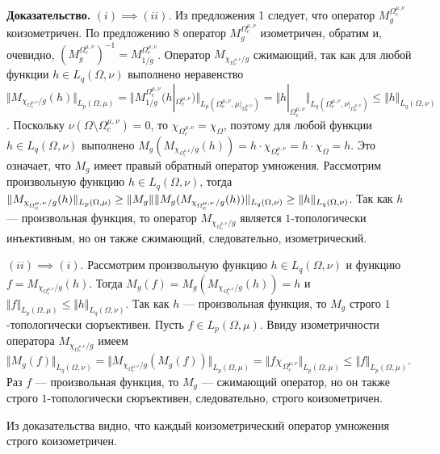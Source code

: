 \documentclass[11pt,twoside]{article}
\begin{document}
\textbf{Доказательство.} $(i)$$\implies$$ (ii)$. Из предложения 1 следует, что
оператор $M_g^{\Omega_c^{\mu,\nu}}$ коизометричен. По предложению 8
оператор $M_g^{\Omega_c^{\mu,\nu}}$ изометричен, обратим и, очевидно,
${(M_g^{\Omega_c^{\mu,\nu}})}^{-1}=M_{1/g}^{\Omega_c^{\mu,\nu}}$.
Оператор $M_{\chi_{\Omega_c^{\mu,\nu}}/g}$ сжимающий, так как для любой
функции $h\in L_q(\Omega,\nu)$ выполнено неравенство $\Vert
M_{\chi_{\Omega_c^{\mu,\nu}}/g}(h)\Vert_{L_p(\Omega,\mu)}= \Vert
M_{1/g}^{\Omega_c^{\mu,\nu}}(h|_{\Omega_c^{\mu,\nu}})
\Vert_{L_p(\Omega_c^{\mu,\nu},\mu|_{\Omega_c^{\mu,\nu}})} =\Vert
h|_{\Omega_c^{\mu,\nu}}
\Vert_{L_q(\Omega_c^{\mu,\nu},\nu|_{\Omega_c^{\mu,\nu}})} \leq\Vert h
\Vert_{L_q(\Omega,\nu)}$. Поскольку
$\nu(\Omega\setminus\Omega_c^{\mu,\nu})=0$, то
$\chi_{\Omega_c^{\mu,\nu}}=\chi_{\Omega}$, поэтому для любой функции
$h\in L_q(\Omega,\nu)$ выполнено
$M_g(M_{\chi_{\Omega_c^{\mu,\nu}}/g}(h))
=h\cdot\chi_{\Omega_c^{\mu,\nu}} =h\cdot\chi_{\Omega}=h$. Это означает,
что $M_g$ имеет правый обратный оператор умножения. Рассмотрим
произвольную функцию $h\in L_q(\Omega,\nu)$, тогда $\Vert
M_{\chi_{\Omega_c^{\mu,\nu}}/g}(h)\Vert_{L_p(\Omega,\mu)} \geq\Vert
M_g\Vert\Vert
M_g(M_{\chi_{\Omega_c^{\mu,\nu}}/g}(h))\Vert_{L_q(\Omega,\nu)}\\
\geq\Vert h\Vert_{L_q(\Omega,\nu)}$. Так как $h$ --- произвольная функция,
то оператор $M_{\chi_{\Omega_c^{\mu,\nu}}/g}$ является $1$-топологически
инъективным, но он также сжимающий, следовательно, изометрический.

$(ii)$$\implies$$ (i)$. Рассмотрим произвольную функцию $h\in
L_q(\Omega,\nu)$ и функцию $f=M_{\chi_{\Omega_c^{\mu,\nu}}/g}(h)$. Тогда
$M_g(f)=M_g(M_{\chi_{\Omega_c^{\mu,\nu}}/g}(h))=h$ и $\Vert
f\Vert_{L_p(\Omega,\mu)}\leq\Vert h\Vert_{L_q(\Omega,\nu)}$. Так как $h$
--- произвольная функция, то $M_g$ строго $1$-топологически сюръективен.
Пусть $f\in L_p(\Omega,\mu)$. Ввиду изометричности оператора
$M_{\chi_{\Omega_c^{\mu,\nu}}/g}$ имеем $\Vert
M_g(f)\Vert_{L_q(\Omega,\nu)} =\Vert
M_{\chi_{\Omega_c^{\mu,\nu}}/g}(M_g(f))\Vert_{L_p(\Omega,\mu)} =\Vert
f\chi_{\Omega_c^{\mu,\nu}}\Vert_{L_p(\Omega,\mu)} \leq\Vert
f\Vert_{L_p(\Omega,\mu)}$. Раз $f$ --- произвольная функция, то $M_g$
--- сжимающий оператор, но он также строго $1$-топологически
сюръективен, следовательно, строго коизометричен.

Из доказательства видно, что каждый коизометрический оператор умножения
строго коизометричен.
\end{document}
